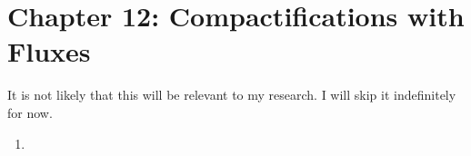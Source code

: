 \documentclass[11pt, class=article, crop=false]{standalone}
\begin{document}
\section*{Chapter 12: Compactifications with Fluxes} %
\label{sec:chapter_12_compactifications_with_fluxes}
\begin{center}
	It is not likely that this will be relevant to my research. I will skip it indefinitely for now.
\end{center}
\begin{enumerate}
	\item
\end{enumerate}

\end{document}
